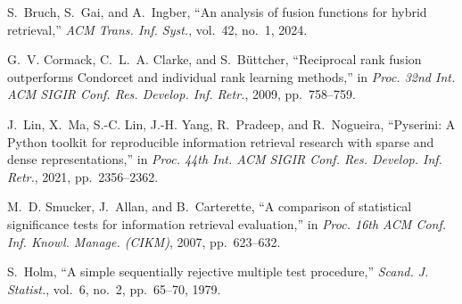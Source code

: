 S.~Bruch, S.~Gai, and A.~Ingber, ``An analysis of fusion functions for hybrid retrieval,'' \emph{ACM Trans. Inf. Syst.}, vol.~42, no.~1, 2024.

G.~V. Cormack, C.~L.~A. Clarke, and S.~B{\"u}ttcher, ``Reciprocal rank fusion outperforms Condorcet and individual rank learning methods,'' in \emph{Proc. 32nd Int. ACM SIGIR Conf. Res. Develop. Inf. Retr.}, 2009, pp.~758--759.

J.~Lin, X.~Ma, S.-C. Lin, J.-H. Yang, R.~Pradeep, and R.~Nogueira, ``Pyserini: A Python toolkit for reproducible information retrieval research with sparse and dense representations,'' in \emph{Proc. 44th Int. ACM SIGIR Conf. Res. Develop. Inf. Retr.}, 2021, pp.~2356--2362.

M.~D. Smucker, J.~Allan, and B.~Carterette, ``A comparison of statistical significance tests for information retrieval evaluation,'' in \emph{Proc. 16th ACM Conf. Inf. Knowl. Manage. (CIKM)}, 2007, pp.~623--632.

S.~Holm, ``A simple sequentially rejective multiple test procedure,'' \emph{Scand. J. Statist.}, vol.~6, no.~2, pp.~65--70, 1979.

